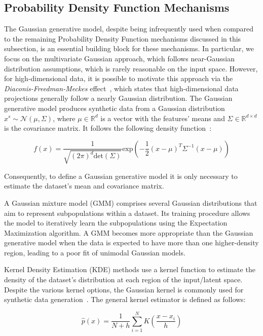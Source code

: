 \subsection{Probability Density Function Mechanisms}

The Gaussian generative model, despite being infrequently used when compared to the
remaining Probability Density Function mechanisms discussed in this subsection,
is an essential building block for these mechanisms. In particular, we focus
on the multivariate Gaussian approach, which follows near-Gaussian
distribution assumptions, which is rarely reasonable on the input space.
However, for high-dimensional data, it is possible to motivate this approach
via the \textit{Diaconis-Freedman-Meckes} effect~\cite{meckes2012projections},
which states that high-dimensional data projections generally follow a nearly
Gaussian distribution. The Gaussian generative model produces synthetic data
from a Gaussian distribution $x^s \sim \mathcal{N}(\mu, \Sigma)$, where $\mu
\in \mathbb{R}^d$ is a vector with the features' means and $\Sigma \in
\mathbb{R}^{d \times d}$ is the covariance matrix. It follows the following
density function~\cite{chanyaswad2019ron}:

\begin{equation}\label{eq:gaussian}
    f(x) =
    \frac{1}{\sqrt{(2\pi)^d\text{det}(\Sigma)}}\text{exp}\left(-\frac{1}{2}(x-\mu)^T\Sigma^{-1}(x-\mu)\right)
\end{equation}

Consequently, to define a Gaussian generative model it is only necessary to
estimate the dataset's mean and covariance matrix.

A Gaussian mixture model (GMM) comprises several Gaussian distributions that
aim to represent subpopulations within a dataset. Its training procedure
allows the model to iteratively learn the subpopulations using the Expectation
Maximization algorithm. A GMM becomes more appropriate than the Gaussian
generative model when the data is expected to have more than one
higher-density region, leading to a poor fit of unimodal Gaussian models.

Kernel Density Estimation (KDE) methods use a kernel function to estimate the
density of the dataset's distribution at each region of the input/latent
space. Despite the various kernel options, the Gaussian kernel is commonly
used for synthetic data generation~\cite{tang2015kerneladasyn}. The general
kernel estimator is defined as follows: 

\begin{equation}
    \hat{p}(x) = \frac{1}{N+h}
    \sum_{i=1}^{N}K\left(\frac{x-x_i}{h}\right)
\end{equation}

